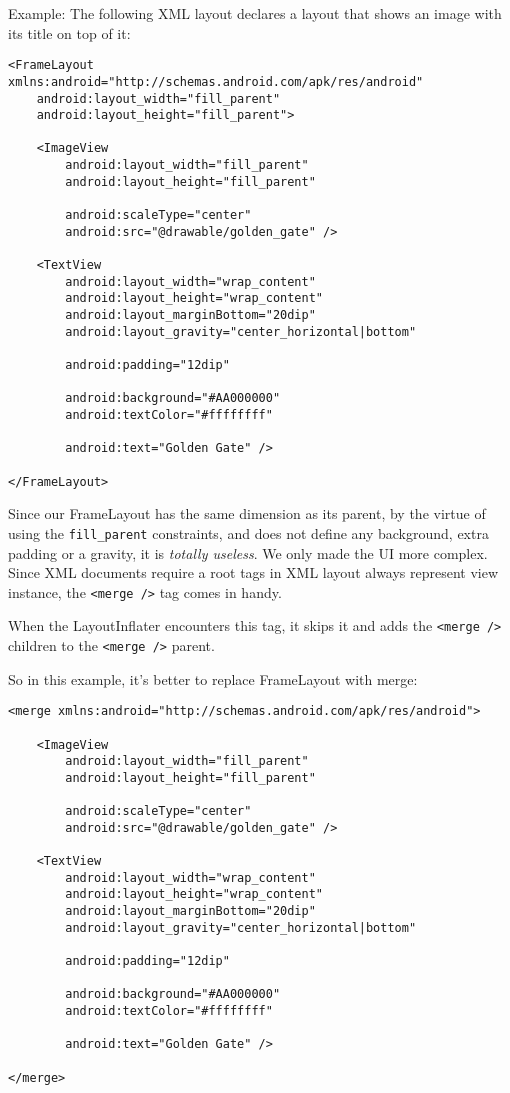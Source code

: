 \documentclass[11pt, a4paper]{book}
\begin{document}
Example: The following XML layout declares a layout that shows an image with its
title on top of it:
\begin{verbatim}
<FrameLayout xmlns:android="http://schemas.android.com/apk/res/android"
    android:layout_width="fill_parent"
    android:layout_height="fill_parent">

    <ImageView  
        android:layout_width="fill_parent" 
        android:layout_height="fill_parent" 
    
        android:scaleType="center"
        android:src="@drawable/golden_gate" />
    
    <TextView
        android:layout_width="wrap_content" 
        android:layout_height="wrap_content" 
        android:layout_marginBottom="20dip"
        android:layout_gravity="center_horizontal|bottom"

        android:padding="12dip"
        
        android:background="#AA000000"
        android:textColor="#ffffffff"
        
        android:text="Golden Gate" />

</FrameLayout>
\end{verbatim}
Since our FrameLayout has the same dimension as its parent, by the virtue of
using the \verb|fill_parent| constraints, and does not define any background,
extra padding or a gravity, it is \emph{totally useless}. We only made the UI
more complex. Since XML documents require a root tags in XML layout always
represent view instance, the \verb|<merge />| tag comes in handy.

When the LayoutInflater encounters this tag, it skips it and adds the
\verb|<merge />| children to the \verb|<merge />| parent.

So in this example, it's better to replace FrameLayout with merge:
\begin{verbatim}
<merge xmlns:android="http://schemas.android.com/apk/res/android">

    <ImageView  
        android:layout_width="fill_parent" 
        android:layout_height="fill_parent" 
    
        android:scaleType="center"
        android:src="@drawable/golden_gate" />
    
    <TextView
        android:layout_width="wrap_content" 
        android:layout_height="wrap_content" 
        android:layout_marginBottom="20dip"
        android:layout_gravity="center_horizontal|bottom"

        android:padding="12dip"
        
        android:background="#AA000000"
        android:textColor="#ffffffff"
        
        android:text="Golden Gate" />

</merge>
\end{verbatim}
\end{document}
